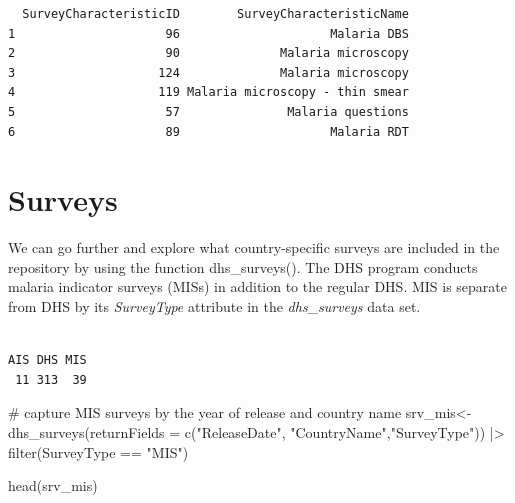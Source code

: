 \documentclass[
  letterpaper,
  DIV=11,
  numbers=noendperiod]{scrreprt}
\newenvironment{Shaded}{\begin{snugshade}}{\end{snugshade}}
\newcommand{\AttributeTok}[1]{\textcolor[rgb]{0.40,0.45,0.13}{#1}}
\newcommand{\CommentTok}[1]{\textcolor[rgb]{0.37,0.37,0.37}{#1}}
\newcommand{\FunctionTok}[1]{\textcolor[rgb]{0.28,0.35,0.67}{#1}}
\newcommand{\NormalTok}[1]{\textcolor[rgb]{0.00,0.23,0.31}{#1}}
\newcommand{\OtherTok}[1]{\textcolor[rgb]{0.00,0.23,0.31}{#1}}
\newcommand{\SpecialCharTok}[1]{\textcolor[rgb]{0.37,0.37,0.37}{#1}}
\newcommand{\StringTok}[1]{\textcolor[rgb]{0.13,0.47,0.30}{#1}}
\begin{document}
\begin{verbatim}
  SurveyCharacteristicID        SurveyCharacteristicName
1                     96                     Malaria DBS
2                     90              Malaria microscopy
3                    124              Malaria microscopy
4                    119 Malaria microscopy - thin smear
5                     57               Malaria questions
6                     89                     Malaria RDT
\end{verbatim}

\hypertarget{surveys}{%
\section{Surveys}\label{surveys}}

We can go further and explore what country-specific surveys are included
in the repository by using the function dhs\_surveys(). The DHS program
conducts malaria indicator surveys (MISs) in addition to the regular
DHS. MIS is separate from DHS by its \emph{SurveyType} attribute in the
\emph{dhs\_surveys} data set.

\begin{Shaded}
\end{Shaded}

\begin{verbatim}

AIS DHS MIS 
 11 313  39 
\end{verbatim}

\begin{Shaded}
\begin{Highlighting}[]
\CommentTok{\# capture MIS surveys by the year of release and country name }
\NormalTok{srv\_mis}\OtherTok{\textless{}{-}} \FunctionTok{dhs\_surveys}\NormalTok{(}\AttributeTok{returnFields =}
                        \FunctionTok{c}\NormalTok{(}\StringTok{"ReleaseDate"}\NormalTok{, }\StringTok{"CountryName"}\NormalTok{,}\StringTok{"SurveyType"}\NormalTok{)) }\SpecialCharTok{|\textgreater{}}
  \FunctionTok{filter}\NormalTok{(SurveyType }\SpecialCharTok{==} \StringTok{"MIS"}\NormalTok{)}

\FunctionTok{head}\NormalTok{(srv\_mis)}
\end{Highlighting}
\end{Shaded}
\end{document}
